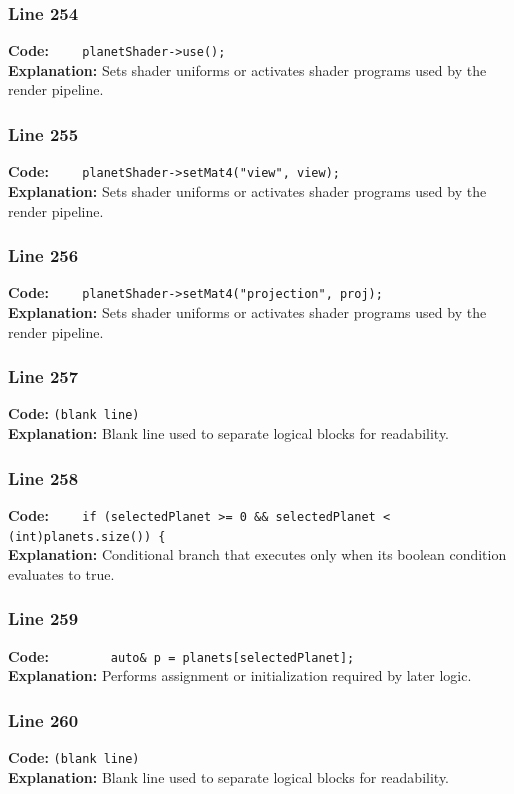 \documentclass[11pt,a4paper]{article}
\begin{document}
\subsubsection*{Line 254}
\textbf{Code:} \verb|    planetShader->use();|\\
\textbf{Explanation:} Sets shader uniforms or activates shader programs used by the render pipeline.

\subsubsection*{Line 255}
\textbf{Code:} \verb|    planetShader->setMat4("view", view);|\\
\textbf{Explanation:} Sets shader uniforms or activates shader programs used by the render pipeline.

\subsubsection*{Line 256}
\textbf{Code:} \verb|    planetShader->setMat4("projection", proj);|\\
\textbf{Explanation:} Sets shader uniforms or activates shader programs used by the render pipeline.

\subsubsection*{Line 257}
\textbf{Code:} \texttt{(blank line)}\\
\textbf{Explanation:} Blank line used to separate logical blocks for readability.

\subsubsection*{Line 258}
\textbf{Code:} \verb|    if (selectedPlanet >= 0 && selectedPlanet < (int)planets.size()) {|\\
\textbf{Explanation:} Conditional branch that executes only when its boolean condition evaluates to true.

\subsubsection*{Line 259}
\textbf{Code:} \verb|        auto& p = planets[selectedPlanet];|\\
\textbf{Explanation:} Performs assignment or initialization required by later logic.

\subsubsection*{Line 260}
\textbf{Code:} \texttt{(blank line)}\\
\textbf{Explanation:} Blank line used to separate logical blocks for readability.
\end{document}
